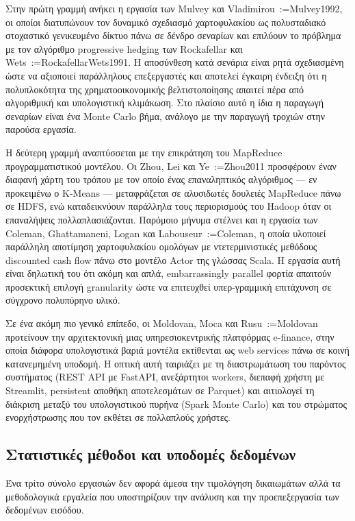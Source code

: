 \documentclass[12pt]{article}
\makeatletter
\newcommand{\citeyear}[1]{\@for\@tempa:=#1\do{\@ifundefined{cy@\@tempa}{(\@tempa)}{(\csname cy@\@tempa\endcsname)}}}
\makeatother
\begin{document}
Στην πρώτη γραμμή ανήκει η εργασία των Mulvey και Vladimirou~\citeyear{Mulvey1992}, οι οποίοι διατυπώνουν τον δυναμικό σχεδιασμό χαρτοφυλακίου ως πολυσταδιακό στοχαστικό γενικευμένο δίκτυο πάνω σε δένδρο σεναρίων και επιλύουν το πρόβλημα με τον αλγόριθμο progressive hedging των Rockafellar και Wets~\citeyear{RockafellarWets1991}. Η αποσύνθεση κατά σενάρια είναι ρητά σχεδιασμένη ώστε να αξιοποιεί παράλληλους επεξεργαστές και αποτελεί έγκαιρη ένδειξη ότι η πολυπλοκότητα της χρηματοοικονομικής βελτιστοποίησης απαιτεί πέρα από αλγοριθμική και υπολογιστική κλιμάκωση. Στο πλαίσιο αυτό η ίδια η παραγωγή σεναρίων είναι ένα Monte Carlo βήμα, ανάλογο με την παραγωγή τροχιών στην παρούσα εργασία.

Η δεύτερη γραμμή αναπτύσσεται με την επικράτηση του MapReduce προγραμματιστικού μοντέλου. Οι Zhou, Lei και Ye~\citeyear{Zhou2011} προσφέρουν έναν διαφανή χάρτη του τρόπου με τον οποίο ένας επαναληπτικός αλγόριθμος — εν προκειμένω ο K-Means — μεταφράζεται σε αλυσιδωτές δουλειές MapReduce πάνω σε HDFS, ενώ καταδεικνύουν παράλληλα τους περιορισμούς του Hadoop όταν οι επαναλήψεις πολλαπλασιάζονται. Παρόμοιο μήνυμα στέλνει και η εργασία των Coleman, Ghattamaneni, Logan και Labouseur~\citeyear{Coleman}, η οποία υλοποιεί παράλληλη αποτίμηση χαρτοφυλακίου ομολόγων με ντετερμινιστικές μεθόδους discounted cash flow πάνω στο μοντέλο Actor της γλώσσας Scala. Η εργασία αυτή είναι δηλωτική του ότι ακόμη και απλά, embarrassingly parallel φορτία απαιτούν προσεκτική επιλογή granularity ώστε να επιτευχθεί υπερ-γραμμική επιτάχυνση σε σύγχρονο πολυπύρηνο υλικό.

Σε ένα ακόμη πιο γενικό επίπεδο, οι Moldovan, Moca και Rusu~\citeyear{Moldovan} προτείνουν την αρχιτεκτονική μιας υπηρεσιοκεντρικής πλατφόρμας e-finance, στην οποία διάφορα υπολογιστικά βαριά μοντέλα εκτίθενται ως web services πάνω σε κοινή κατανεμημένη υποδομή. Η οπτική αυτή ταιριάζει με τη διαστρωμάτωση του παρόντος συστήματος (REST API με FastAPI, ανεξάρτητοι workers, διεπαφή χρήστη με Streamlit, persistent αποθήκη αποτελεσμάτων σε Parquet) και αιτιολογεί τη διάκριση μεταξύ του υπολογιστικού πυρήνα (Spark Monte Carlo) και του στρώματος ενορχήστρωσης που τον εκθέτει σε πολλαπλούς χρήστες.

\subsection{Στατιστικές μέθοδοι και υποδομές δεδομένων}
Ένα τρίτο σύνολο εργασιών δεν αφορά άμεσα την τιμολόγηση δικαιωμάτων αλλά τα μεθοδολογικά εργαλεία που υποστηρίζουν την ανάλυση και την προεπεξεργασία των δεδομένων εισόδου.
\end{document}
